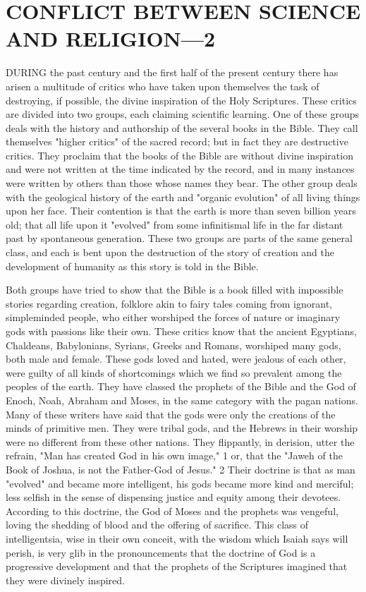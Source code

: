 \chapter{CONFLICT BETWEEN SCIENCE AND RELIGION—2}

DURING the past century and the first half of the present century there has arisen a multitude
of critics who have taken upon themselves the task of destroying, if possible, the divine
inspiration of the Holy Scriptures. These critics are divided into two groups, each claiming
scientific learning. One of these groups deals with the history and authorship of the several
books in the Bible. They call themselves "higher critics" of the sacred record; but in fact they
are destructive critics. They proclaim that the books of the Bible are without divine
inspiration and were not written at the time indicated by the record, and in many instances
were written by others than those whose names they bear. The other group deals with the
geological history of the earth and "organic evolution" of all living things upon her face.
Their contention is that the earth is more than seven billion years old; that all life upon it
"evolved" from some infinitismal life in the far distant past by spontaneous generation. These
two groups are parts of the same general class, and each is bent upon the destruction of the
story of creation and the development of humanity as this story is told in the Bible.

Both groups have tried to show that the Bible is a book filled with impossible stories
regarding creation, folklore akin to fairy tales coming from ignorant, simpleminded people,
who either worshiped the forces of nature or imaginary gods with passions like their own.
These critics know that the ancient Egyptians, Chaldeans, Babylonians, Syrians, Greeks and
Romans, worshiped many gods, both male and female. These gods loved and hated, were
jealous of each other, were guilty of all kinds of shortcomings which we find so prevalent
among the peoples of the earth. They have classed the prophets of the Bible and the God of
Enoch, Noah, Abraham and Moses, in the same category with the pagan nations. Many of
these writers have said that the gods were only the creations of the minds of primitive men.
They were tribal gods, and the Hebrews in their worship were no different from these other
nations. They flippantly, in derision, utter the refrain, "Man has created God in his own
image," 1 or, that the "Jaweh of the Book of Joshua, is not the Father-God of Jesus." 2 Their
doctrine is that as man "evolved" and became more intelligent, his gods became more kind
and merciful; less selfish in the sense of dispensing justice and equity among their devotees.
According to this doctrine, the God of Moses and the prophets was vengeful, loving the
shedding of blood and the offering of sacrifice. This class of intelligentsia, wise in their own
conceit, with the wisdom which Isaiah says will perish, is very glib in the pronouncements
that the doctrine of God is a progressive development and that the prophets of the Scriptures
imagined that they were divinely inspired.

